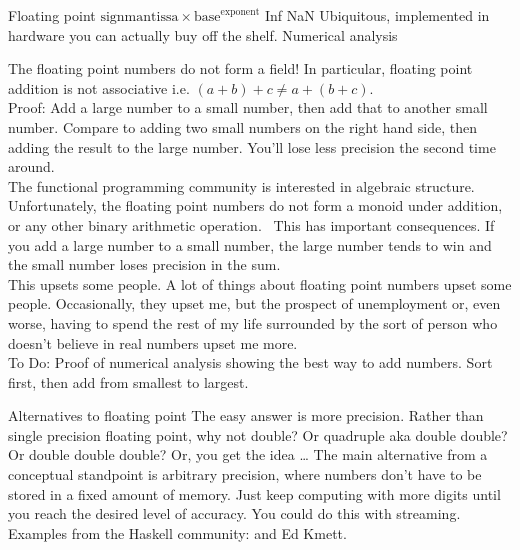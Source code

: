 \documentclass{beamer}
\begin{document}
\begin{frame}{Floating point}
$\text{sign} \text{mantissa} \times \text{base}^\text{exponent}$ Inf NaN
Ubiquitous, implemented in hardware you can actually buy off the shelf.
Numerical analysis
\end{frame}

\begin{frame}{The floating point numbers do not form a field!}
In particular, floating point addition is not associative i.e. $(a + b) + c \ne a + (b + c)$. \\
Proof: Add a large number to a small number, then add that to another small number.
Compare to adding two small numbers on the right hand side, then adding the result to the large number.
You'll lose less precision the second time around. \\
The functional programming community is interested in algebraic structure. Unfortunately, the floating
point numbers do not form a monoid under addition, or any other binary arithmetic operation. \
This has important consequences. If you add a large number to a small number, the large number tends to win
and the small number loses precision in the sum. \\
This upsets some people. A lot of things about floating point numbers upset some people. Occasionally, they
upset me, but the prospect of unemployment or, even worse, having to spend the rest of my life surrounded by
the sort of person who doesn't believe in real numbers upset me more. \\
To Do: Proof of numerical analysis showing the best way to add numbers. Sort first, then add from smallest to
largest.
\end{frame}

\begin{frame}{Alternatives to floating point}
The easy answer is more precision. Rather than single precision floating point, why not double? Or
quadruple aka double double? Or double double double? Or, you get the idea \ldots
The main alternative from a conceptual standpoint is arbitrary precision, where numbers don't have to be
stored in a fixed amount of memory.
Just keep computing with more digits until you reach the desired level of accuracy. You could do this with
streaming.
Examples from the Haskell community: and Ed Kmett.
\end{frame}
\end{document}
